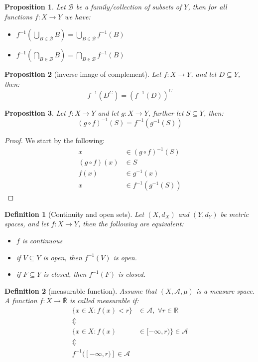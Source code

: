 \documentclass{article}
\newcommand{\R}{\mathbb{R}}
\newcommand{\A}{\mathcal{A}}
\newcommand{\Rbar}{\overline{\mathbb{R}}}%
\newcommand{\B}{\mathcal{B}}
\newtheorem{definition}{Definition}
\newtheorem{prop}{Proposition}
\newtheorem{proof}{Proof}
\begin{document}
\begin{prop}
Let $\B$ be a family/collection of subsets of $Y$, then for all functions $f:X\to Y$ we have: 
\begin{itemize}
    \item $f^{-1}\left(\bigcup_{B\in \B}B\right) = \bigcup_{B\in \B}f^{-1}(B)$
    \item $f^{-1}\left(\bigcap_{B\in \B}B\right) = \bigcap_{B\in \B}f^{-1}(B)$
\end{itemize}
\end{prop}  

\begin{prop}[inverse image of complement]
Let $f:X\to Y$, and let $D\subseteq Y$, then: 
\[f^{-1}(D^{C}) = (f^{-1}(D))^{C}
\]
\end{prop}

\begin{prop}
Let $f:X\to Y$ and let $g:X\to Y$, further let $S\subseteq Y$, then: 
\[(g\circ f)^{-1}(S) = f^{-1}(g^{-1}(S))
\]
\end{prop}

\begin{proof}
We start by the following: 
\begin{align*}
x &\in (g\circ f)^{-1}(S) \\ 
(g\circ f)(x) &\in S\\ 
f(x) &\in g^{-1}(x)\\ 
x &\in f^{-1}(g^{-1}(S))
\end{align*}
\end{proof}



\begin{definition}[Continuity and open sets]
\label{continuity and open sets}
Let $(X, d_{X})$ and $(Y, d_{Y})$ be metric spaces, and let $f:X\to Y$, then the following are equivalent: 
\begin{itemize}
    \item $f$ is continuous
    \item if $V\subseteq Y$ is open, then $f^{-1}(V)$ is open. 
    \item if $F\subseteq Y$ is closed, then $f^{-1}(F)$ is closed.
\end{itemize}
\end{definition}


\begin{definition}[measurable function]
Assume that $(X,\A, \mu)$ is a measure space. A function $f:X\to \Rbar$ is called measurable if: 
\begin{align*}
\{x\in X:f(x)< r\}&\in \A, \; \forall r\in \R \\ 
\Updownarrow \\ 
 \{x\in X: f(x) &\in [-\infty,r) \}\in \A \\ 
 \Updownarrow \\ 
f^{-1}([-\infty, r)]\in \A
\end{align*}
\end{definition} 
\end{document}
